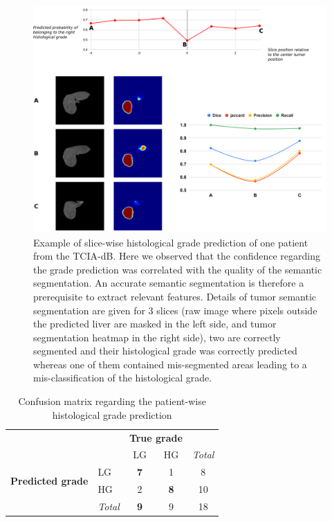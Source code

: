 \documentclass[]{article}
\renewcommand{\arraystretch}{5}
\newcommand{\lmttfont}[1]{{\fontfamily{lmtt}\selectfont #1}}
\begin{document}
\begin{figure}[th!]
	\centering
	\includegraphics[width=0.9\linewidth]{../HistologicalGradePrediction/images/Slice_hist_grad_prediction_details}
	\caption{Example of slice-wise histological grade prediction of one patient from the \lmttfont{TCIA-dB}. Here we observed that the confidence regarding the grade prediction was correlated with the quality of the semantic segmentation. An accurate semantic segmentation is therefore a prerequisite to extract relevant features. Details of tumor semantic segmentation are given for 3 slices (raw image where pixels outside the predicted liver are masked in the left side, and tumor segmentation heatmap in the right side), two are correctly segmented and their histological grade was correctly predicted whereas one of them contained mis-segmented areas leading to a mis-classification of the histological grade.}
	\label{fig:Slice_hist_grad_prediction_details}
\end{figure}




\renewcommand{\arraystretch}{2}
\begin{table}[!htp]\centering
	\caption{Confusion matrix regarding the patient-wise histological grade prediction}\label{tab:confusion_matrix}
	\begin{tabular}{l|l|c|c|c}
		\multicolumn{2}{c}{}&\multicolumn{2}{c}{\textbf{True grade}}&\\
		\cline{3-4}
		\multicolumn{2}{c|}{}&LG&HG&\multicolumn{1}{c}{\textit{Total}}\\
		\cline{2-4}
		\multirow{2}{*}{\textbf{Predicted grade}}& LG & \textbf{7} & 1 & 8\\
		\cline{2-4}
		& HG & 2 & \textbf{8} & 10 \\
		\cline{2-4}
		\multicolumn{1}{c}{} & \multicolumn{1}{c}{\textit{Total}} & \multicolumn{1}{c}{\textbf{9}} & \multicolumn{1}{c}{9} & \multicolumn{1}{c}{18}\\
	\end{tabular}
\end{table}
\renewcommand{\arraystretch}{5}
\end{document}
